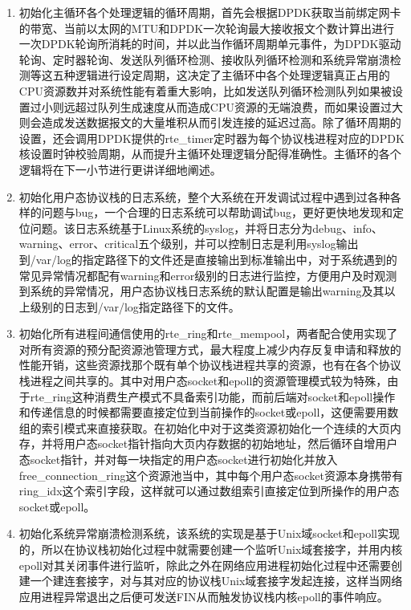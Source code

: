 \begin{enumerate}[(1),labelsep=.5em, leftmargin = 0pt, itemindent = 3em]
\item 初始化主循环各个处理逻辑的循环周期，首先会根据DPDK获取当前绑定网卡的带宽、当前以太网的MTU和DPDK一次轮询最大接收报文个数计算出进行一次DPDK轮询所消耗的时间，并以此当作循环周期单元事件，为DPDK驱动轮询、定时器轮询、发送队列循环检测、接收队列循环检测和系统异常崩溃检测等这五种逻辑进行设定周期，这决定了主循环中各个处理逻辑真正占用的CPU资源数并对系统性能有着重大影响，比如发送队列循环检测队列如果被设置过小则远超过队列生成速度从而造成CPU资源的无端浪费，而如果设置过大则会造成发送数据报文的大量堆积从而引发连接的延迟过高。除了循环周期的设置，还会调用DPDK提供的rte\_timer定时器为每个协议栈进程对应的DPDK核设置时钟校验周期，从而提升主循环处理逻辑分配得准确性。主循环的各个逻辑将在下一小节进行更讲详细地阐述。
\item 初始化用户态协议栈的日志系统，整个大系统在开发调试过程中遇到过各种各样的问题与bug，一个合理的日志系统可以帮助调试bug，更好更快地发现和定位问题。该日志系统基于Linux系统的syslog，并将日志分为debug、info、warning、error、critical五个级别，并可以控制日志是利用syslog输出到/var/log的指定路径下的文件还是直接输出到标准输出中，对于系统遇到的常见异常情况都配有warning和error级别的日志进行监控，方便用户及时观测到系统的异常情况，用户态协议栈日志系统的默认配置是输出warning及其以上级别的日志到/var/log指定路径下的文件。
\item 初始化所有进程间通信使用的rte\_ring和rte\_mempool，两者配合使用实现了对所有资源的预分配资源池管理方式，最大程度上减少内存反复申请和释放的性能开销，这些资源找那个既有单个协议栈进程共享的资源，也有在各个协议栈进程之间共享的。其中对用户态socket和epoll的资源管理模式较为特殊，由于rte\_ring这种消费生产模式不具备索引功能，而前后端对socket和epoll操作和传递信息的时候都需要直接定位到当前操作的socket或epoll，这便需要用数组的索引模式来直接获取。在初始化中对于这类资源初始化一个连续的大页内存，并将用户态socket指针指向大页内存数据的初始地址，然后循环自增用户态socket指针，并对每一块指定的用户态socket进行初始化并放入free\_connection\_ring这个资源池当中，其中每个用户态socket资源本身携带有ring\_idx这个索引字段，这样就可以通过数组索引直接定位到所操作的用户态socket或epoll。
\item 初始化系统异常崩溃检测系统，该系统的实现是基于Unix域socket和epoll实现的，所以在协议栈初始化过程中就需要创建一个监听Unix域套接字，并用内核epoll对其关闭事件进行监听，除此之外在网络应用进程初始化过程中还需要创建一个建连套接字，对与其对应的协议栈Unix域套接字发起连接，这样当网络应用进程异常退出之后便可发送FIN从而触发协议栈内核epoll的事件响应。
\end{enumerate}

